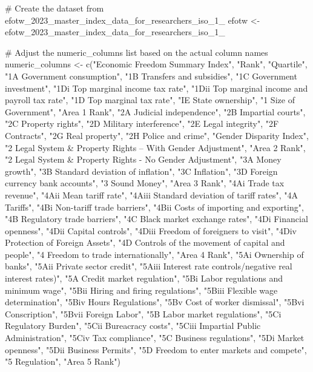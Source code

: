 {{# Create the dataset from efotw_2023_master_index_data_for_researchers_iso_1_
efotw <- efotw_2023_master_index_data_for_researchers_iso_1_

# Adjust the numeric_columns list based on the actual column names
numeric_columns <- c("Economic Freedom Summary Index", "Rank", "Quartile",
                     "1A Government consumption", "1B  Transfers and subsidies",
                     "1C  Government investment", "1Di Top marginal income tax rate",
                     "1Dii Top marginal income and payroll tax rate", "1D  Top marginal tax rate",
                     "IE State ownership", "1  Size of Government", "Area 1 Rank",
                     "2A  Judicial independence", "2B  Impartial courts", "2C  Property rights",
                     "2D  Military interference", "2E Legal integrity", "2F Contracts",
                     "2G Real property", "2H Police and crime", "Gender Disparity Index",
                     "2  Legal System & Property Rights -- With Gender Adjustment", "Area 2 Rank",
                     "2 Legal System & Property Rights - No Gender Adjustment", "3A  Money growth",
                     "3B  Standard deviation of inflation", "3C  Inflation",
                     "3D  Foreign currency bank accounts", "3  Sound Money", "Area 3 Rank",
                     "4Ai  Trade tax revenue", "4Aii  Mean tariff rate", "4Aiii  Standard deviation of tariff rates",
                     "4A  Tariffs", "4Bi  Non-tariff trade barriers", "4Bii  Costs of importing and exporting",
                     "4B  Regulatory trade barriers", "4C  Black market exchange rates",
                     "4Di  Financial openness", "4Dii  Capital controls", "4Diii Freedom of foreigners to visit",
                     "4Div Protection of Foreign Assets", "4D  Controls of the movement of capital and people",
                     "4  Freedom to trade internationally", "Area 4 Rank",
                     "5Ai  Ownership of banks", "5Aii Private sector credit",
                     "5Aiii  Interest rate controls/negative real interest rates)", "5A  Credit market regulation",
                     "5Bi  Labor regulations and minimum wage", "5Bii  Hiring and firing regulations",
                     "5Biii  Flexible wage determination", "5Biv  Hours Regulations", "5Bv Cost of worker dismissal",
                     "5Bvi  Conscription", "5Bvii Foreign Labor", "5B  Labor market regulations",
                     "5Ci  Regulatory Burden", "5Cii  Bureacracy costs", "5Ciii  Impartial Public Administration",
                     "5Civ Tax compliance", "5C  Business regulations", "5Di  Market openness",
                     "5Dii Business Permits", "5D Freedom to enter markets and compete", "5  Regulation", "Area 5 Rank")

}}
